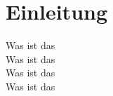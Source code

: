 

\section{Einleitung}
\begin{frame}
    Was ist das \\
    Was ist das \\
    Was ist das \\
    Was ist das \\
\end{frame}